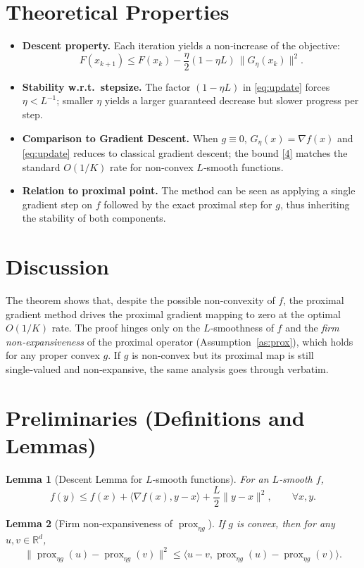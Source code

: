 \documentclass{article}
\newtheorem{lemma}{Lemma}
\newcommand{\prox}{\operatorname{prox}}
\newcommand{\grad}{\nabla}
\newcommand{\R}{\mathbb{R}}
\begin{document}
\section*{Theoretical Properties}
\begin{itemize}[noitemsep,leftmargin=*]
\item \textbf{Descent property.} Each iteration yields a non‑increase of the objective:
\[
F(x_{k+1})\le F(x_{k})-\frac{\eta}{2}(1-\eta L)\,\|G_{\eta}(x_{k})\|^{2}.
\tag{5}
\]
\item \textbf{Stability w.r.t.\ stepsize.} The factor $(1-\eta L)$ in \eqref{eq:update} forces $\eta<L^{-1}$; smaller $\eta$ yields a larger guaranteed decrease but slower progress per step.
\item \textbf{Comparison to Gradient Descent.} When $g\equiv0$, $G_{\eta}(x)=\grad f(x)$ and \eqref{eq:update} reduces to classical gradient descent; the bound \eqref{4} matches the standard $O(1/K)$ rate for non‑convex $L$‑smooth functions.
\item \textbf{Relation to proximal point.} The method can be seen as applying a single gradient step on $f$ followed by the exact proximal step for $g$, thus inheriting the stability of both components.
\end{itemize}

\section*{Discussion}
The theorem shows that, despite the possible non‑convexity of $f$, the proximal gradient method drives the proximal gradient mapping to zero at the optimal $O(1/K)$ rate. The proof hinges only on the $L$‑smoothness of $f$ and the \emph{firm non‑expansiveness} of the proximal operator (Assumption~\ref{as:prox}), which holds for any proper convex $g$. If $g$ is non‑convex but its proximal map is still single‑valued and non‑expansive, the same analysis goes through verbatim.

\section*{Preliminaries (Definitions and Lemmas)}
\begin{lemma}[Descent Lemma for $L$‑smooth functions]\label{lem:descent}
For an $L$‑smooth $f$,
\[
f(y)\le f(x)+\langle\grad f(x),y-x\rangle+\frac{L}{2}\|y-x\|^{2},\qquad\forall x,y.
\]
\end{lemma}

\begin{lemma}[Firm non‑expansiveness of $\prox_{\eta g}$]\label{lem:firm}
If $g$ is convex, then for any $u,v\in\R^{d}$,
\[
\|\prox_{\eta g}(u)-\prox_{\eta g}(v)\|^{2}
\le\langle u-v,\prox_{\eta g}(u)-\prox_{\eta g}(v)\rangle .
\tag{6}
\]
\end{lemma}
\end{document}
